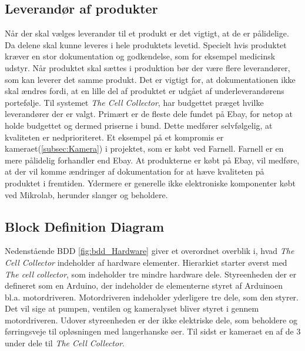 \subsection{Leverandør af produkter}
Når der skal vælges leverandør til et produkt er det vigtigt, at de er pålidelige. Da delene skal kunne leveres i hele produktets levetid. Specielt hvis produktet kræver en stor dokumentation og godkendelse, som for eksempel medicinsk udstyr. Når produktet skal sættes i produktion bør der være flere leverandører, som kan leverer det samme produkt. Det er vigtigt for, at dokumentationen ikke skal ændres fordi, at en lille del af produktet er udgået af underleverandørens portefølje.
Til systemet \textit{The Cell Collector}, har budgettet præget hvilke leverandører der er valgt. Primært er de fleste dele fundet på Ebay, for netop at holde budgettet og dermed priserne i bund. Dette medfører selvfølgelig, at kvaliteten er nedprioriteret. Et eksempel på et kompromis er kameraet(\ref{subsec:Kamera}) i projektet, som er købt ved Farnell. Farnell er en mere pålidelig forhandler end Ebay. At produkterne er købt på Ebay, vil medføre, at der vil komme ændringer af dokumentation for  at hæve kvaliteten på produktet i fremtiden. Ydermere er generelle ikke elektroniske komponenter købt ved Mikrolab, herunder slanger og beholdere. 

     


 
 
 
 
 \newpage
\subsection{Block Definition Diagram}  
\label{sub:bdd_hardware}
Nedenstående BDD \ref{fig:bdd_Hardware} giver et overordnet overblik i, hvad \textit{The Cell Collector} indeholder af hardware elementer. Hierarkiet starter øverst med \textit{The cell collector}, som indeholder tre mindre hardware dele. Styreenheden der er defineret som en Arduino, der indeholder de elementerne styret af Arduinoen bl.a. motordriveren. Motordriveren indeholder yderligere tre dele, som den styrer. Det vil sige at pumpen, ventilen og kameralyset bliver styret i gennem motordriveren. Udover styreenheden er der ikke elektriske dele, som beholdere og førringsveje til opløsningen med langerhanske øer. Til sidst er kameraet en af de 3 under dele til \textit{The Cell Collector}.

